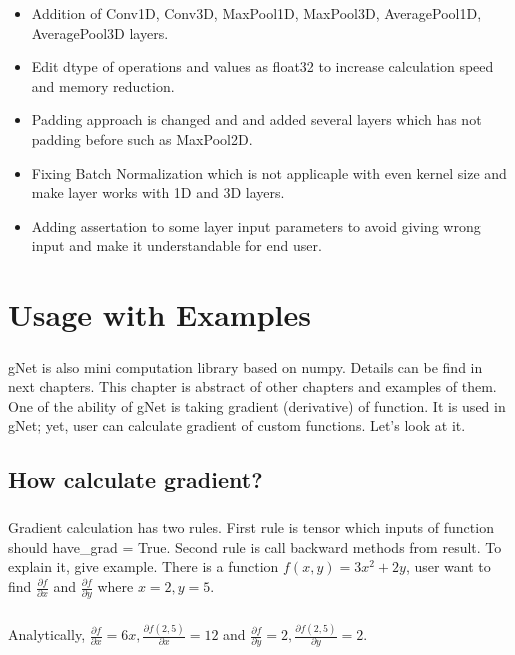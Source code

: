 \documentclass[12pt]{report}
\begin{document}
\begin{itemize}
	\item Addition of Conv1D, Conv3D, MaxPool1D, MaxPool3D, AveragePool1D, AveragePool3D layers.
	\item Edit dtype of operations and values as float32 to increase calculation speed and memory reduction. 
	\item Padding approach is changed and and added several layers which has not padding before such as MaxPool2D.
	\item Fixing Batch Normalization which is not applicaple with even kernel size and make layer works with 1D and 3D layers. 
	\item Adding assertation to some layer input parameters to avoid giving wrong input and make it understandable for end user.
\end{itemize}



\chapter{Usage with Examples}

\paragraph{}
gNet is also mini computation library based on numpy. Details can be find in next chapters. This chapter is abstract of other chapters and examples of them. One of the ability of gNet is taking gradient (derivative) of function. It is used in gNet; yet, user can calculate gradient of custom functions. Let's look at it.

\section{How calculate gradient?}
\paragraph{}
Gradient calculation has two rules. First rule is tensor which inputs of function should have\_grad = True. Second rule is call backward methods from result. To explain it, give example. There is a function $f(x,y) = 3x^2 + 2y$, user want to find $\frac{\partial f}{\partial x}$ and $\frac{\partial f}{\partial y}$ where $x=2, y=5$. 

\paragraph{}
Analytically, $\frac{\partial f}{\partial x} = 6x, \frac{\partial f(2,5)}{\partial x} = 12$ and  $\frac{\partial f}{\partial y} = 2, \frac{\partial f(2,5)}{\partial y} = 2$. 
\end{document}
